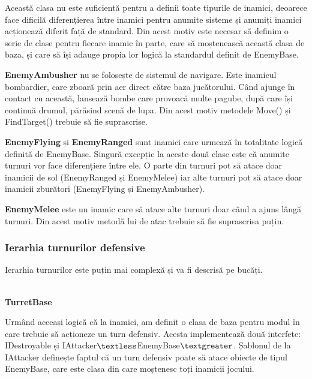 \documentclass[12pt, a4paper]{article}
\begin{document}
	Această clasa nu este suficientă pentru a definii toate tipurile de inamici, deoarece face dificilă diferențierea între inamici pentru anumite sisteme și anumiți inamici acționează diferit față de standard. Din acest motiv este necesar să definim o serie de clase pentru fiecare inamic în parte, care să moștenească această clasa de baza, și care să își adauge propia lor logică la standardul definit de EnemyBase.
	\newline
	
	\textbf{EnemyAmbusher} nu se folosește de sistemul de navigare. Este inamicul bombardier, care zboară prin aer direct către baza jucătorului. Când ajunge în contact cu această, lansează bombe care provoacă multe pagube, după care își continuă drumul, părăsind scenă de lupa. Din acest motiv metodele Move() și FindTarget() trebuie să fie suprascrise.
	\newline
	
	\textbf{EnemyFlying} și \textbf{EnemyRanged} sunt inamici care urmează în totalitate logică definită de EnemyBase. Singură excepție la aceste două clase este că anumite turnuri vor face diferențiere între ele. O parte din turnuri pot să atace doar inamicii de sol (EnemyRanged și EnemyMelee) iar alte turnuri pot să atace doar inamicii zburători (EnemyFlying și EnemyAmbusher).
	\newline
	
	\textbf{EnemyMelee} este un inamic care să atace alte turnuri doar când a ajuns lângă turnuri. Din acest motiv metodă lui de atac trebuie să fie suprascrisa puțin.
	
	
	
	
	
	\subsubsection{Ierarhia turnurilor defensive}
	\label{section: turretHierachy}
	
	Ierarhia turnurilor este puțin mai complexă și va fi descrisă pe bucăți.
	
	\ \\
	\textbf{TurretBase}
	
	Urmând aceeași logică că la inamici, am definit o clasa de baza pentru modul în care trebuie să acționeze un turn defensiv. Acesta implementează două interfețe: IDestroyable și IAttacker$\textless$EnemyBase$\textgreater$. Șablonul de la IAttacker definește faptul că un turn defensiv poate să atace obiecte de tipul EnemyBase, care este clasa din care moștenesc toți inamicii jocului.
	\newline
	
\end{document}
